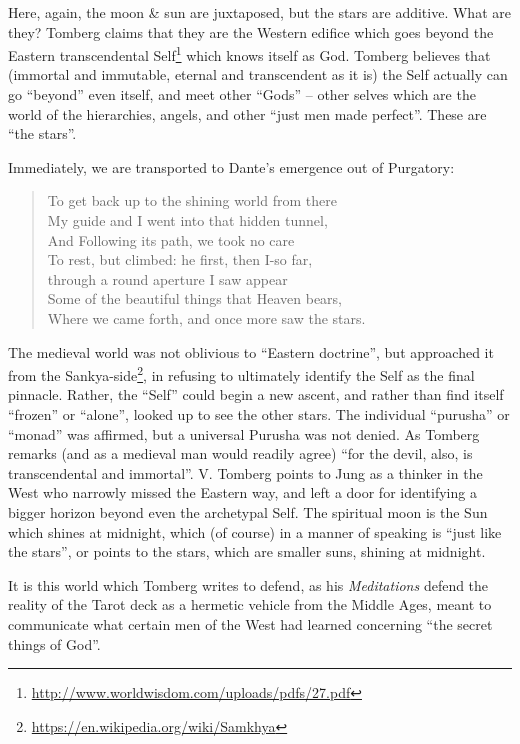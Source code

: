Here, again, the moon \& sun are juxtaposed, but the stars are additive. What are they? Tomberg claims that they are the Western edifice which goes beyond the Eastern transcendental Self\footnote{\url{http://www.worldwisdom.com/uploads/pdfs/27.pdf}} which knows itself as God. Tomberg believes that (immortal and immutable, eternal and transcendent as it is) the Self actually can go ``beyond'' even itself, and meet other ``Gods'' -- other selves which are the world of the hierarchies, angels, and other ``just men made perfect''. These are ``the stars''.

Immediately, we are transported to Dante's emergence out of Purgatory:

\begin{quotex}
\begin{verse}
To get back up to the shining world from there\\
My guide and I went into that hidden tunnel,\\
And Following its path, we took no care\\
To rest, but climbed: he first, then I-so far,\\
through a round aperture I saw appear\\
Some of the beautiful things that Heaven bears,\\
Where we came forth, and once more saw the stars.
\end{verse}

\end{quotex}


The medieval world was not oblivious to ``Eastern doctrine'', but approached it from the Sankya-side\footnote{\url{https://en.wikipedia.org/wiki/Samkhya}}, in refusing to ultimately identify the Self as the final pinnacle. Rather, the ``Self'' could begin a new ascent, and rather than find itself ``frozen'' or ``alone'', looked up to see the other stars. The individual ``purusha'' or ``monad'' was affirmed, but a universal Purusha was not denied. As Tomberg remarks (and as a medieval man would readily agree) ``for the devil, also, is transcendental and immortal''. V. Tomberg points to Jung as a thinker in the West who narrowly missed the Eastern way, and left a door for identifying a bigger horizon beyond even the archetypal Self. The spiritual moon is the Sun which shines at midnight, which (of course) in a manner of speaking is ``just like the stars'', or points to the stars, which are smaller suns, shining at midnight.

It is this world which Tomberg writes to defend, as his \emph{Meditations} defend the reality of the Tarot deck as a hermetic vehicle from the Middle Ages, meant to communicate what certain men of the West had learned concerning ``the secret things of God''.


